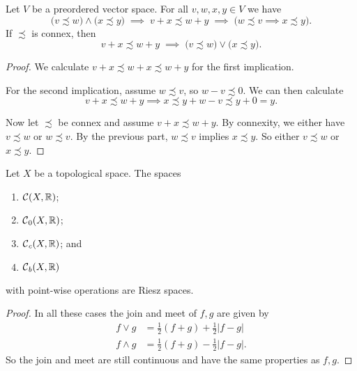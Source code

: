 \begin{lemma} \label{additionVectorInequalities}
Let $V$ be a preordered vector space. For all $v,w, x, y \in V$ we have
\[ \big(v \precsim w\big) \land \big(x \precsim y\big) \;\implies\; v+ x \precsim w+y \;\implies\; \Big( w \precsim v \implies x\precsim y\Big). \]
If $\precsim$ is connex, then
\[ v+ x \precsim w+y \;\implies\; \big(v\precsim w\big)\lor\big( x\precsim y\big). \]
\end{lemma}
\begin{proof}
We calculate $v + x \precsim w + x \precsim w+y$ for the first implication.

For the second implication, assume $w\precsim v$, so $w-v \precsim 0$. We can then calculate
\[ v+ x \precsim w+y \implies x\precsim y + w - v \precsim y + 0 = y. \]

Now let $\precsim$ be connex and assume $v+ x \precsim w+y$. By connexity, we either have $v\precsim w$ or $w\precsim v$. By the previous part, $w\precsim v$ implies $x\precsim y$. So either $v\precsim w$ or $x\precsim y$.
\end{proof}


\begin{lemma}
Let $X$ be a topological space. The spaces
\begin{enumerate}
\item $\operatorname{\mathcal{C}}(X,\mathbb{R})$;
\item $\operatorname{\mathcal{C}}_0(X,\mathbb{R})$;
\item $\operatorname{\mathcal{C}}_c(X,\mathbb{R})$; and
\item $\operatorname{\mathcal{C}}_b(X,\mathbb{R})$
\end{enumerate}
with point-wise operations are Riesz spaces.
\end{lemma}
\begin{proof}
In all these cases the join and meet of $f,g$ are given by
\begin{align*}
f \vee g &= \frac{1}{2}(f+g)+ \frac{1}{2}|f-g| \\
f \wedge g &= \frac{1}{2}(f+g) - \frac{1}{2}|f-g|.
\end{align*}
So the join and meet are still continuous and have the same properties as $f,g$.
\end{proof}

